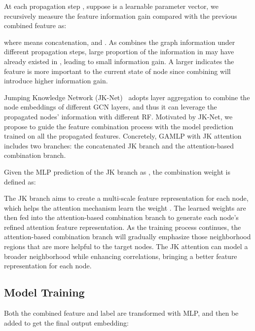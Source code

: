 \documentclass[sigconf]{acmart}
\begin{document}
\begin{definition}
\label{df2}
At each propagation step , suppose  is a learnable parameter vector, we recursively measure the feature information gain compared with the previous combined feature as:

\end{definition}
where  means concatenation, and .
As  combines the graph information under different propagation steps,  large proportion of the information in  may have already existed in , leading to small information gain.
A larger  indicates the feature  is more important to the current state of node  since combining  will introduce higher information gain.

Jumping Knowledge Network (JK-Net)~\citep{xu2018representation} adopts layer aggregation to combine the node embeddings of different GCN layers, and thus it can leverage the propagated nodes' information with different RF. Motivated by JK-Net, we propose to guide the feature combination process with the model prediction trained on all the propagated features.   
Concretely, GAMLP with JK attention includes two branches: the concatenated JK branch and the attention-based combination branch.
\begin{definition}
\label{df3}
Given the MLP prediction of the JK branch as , the combination weight is defined as:

\end{definition}
The JK branch aims to create a multi-scale feature representation for each node, which helps the attention mechanism learn the weight .
The learned weights are then fed into the attention-based combination branch to generate each node's refined attention feature representation.
As the training process continues, the attention-based combination branch will gradually 
emphasize those neighborhood regions that are more helpful to the target nodes.
The JK attention can model a broader neighborhood while enhancing correlations, bringing a better feature representation for each node.






















\subsection{Model Training}
Both the combined feature  and label  are transformed with MLP, and then be added to get the final output embedding:
\end{document}
